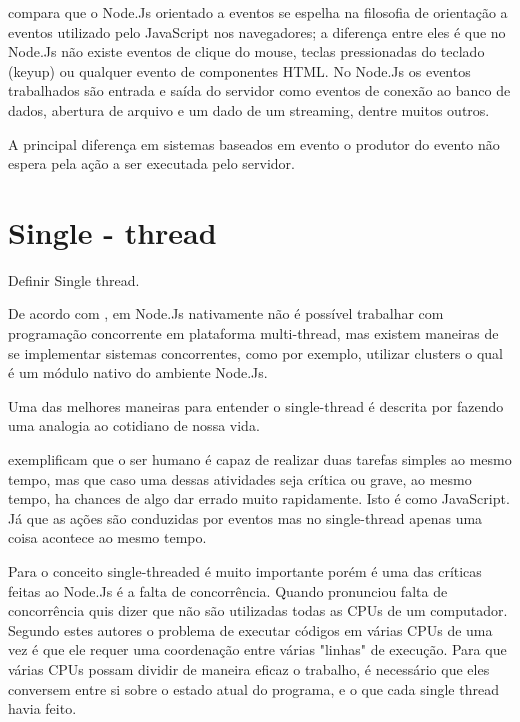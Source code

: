    compara que o Node.Js orientado a eventos se espelha na filosofia de orientação 
  a eventos utilizado pelo JavaScript nos navegadores; a diferença entre eles é que no Node.Js 
  não existe eventos de clique do mouse, teclas pressionadas do teclado (keyup) ou qualquer evento de componentes HTML.
  No Node.Js os eventos trabalhados são entrada e saída do servidor como eventos de conexão 
  ao banco de dados, abertura de arquivo e um dado de um streaming, dentre muitos outros.
  
  A principal diferença em sistemas baseados em evento o produtor do evento não espera pela ação a ser executada
  pelo servidor. \cite{Junior:2012}   


\section{Single - thread}
\label{single-thread}

  Definir Single thread.
  
  De acordo com , em Node.Js nativamente não é possível trabalhar com programação 
  concorrente em plataforma multi-thread, mas existem maneiras de se implementar sistemas concorrentes, 
  como por exemplo, utilizar clusters o qual é um módulo nativo do ambiente Node.Js.
  
  Uma das melhores maneiras para entender o single-thread é descrita por 
  fazendo uma analogia ao cotidiano de nossa vida.
  
   exemplificam que o ser humano é capaz de realizar duas tarefas simples ao mesmo tempo,
  mas que caso uma dessas atividades seja crítica ou grave, ao mesmo tempo, ha chances de algo dar errado muito rapidamente. 
  Isto é como JavaScript. Já que as ações são conduzidas por eventos mas no single-thread apenas uma coisa 
  acontece ao mesmo tempo.
  
  Para  o conceito single-threaded é muito importante porém é uma das críticas 
  feitas ao Node.Js é a falta de concorrência. Quando  pronunciou falta de concorrência 
  quis dizer que não são utilizadas todas as CPUs de um computador. 
  Segundo estes autores o problema de executar códigos em várias CPUs de uma vez é que ele requer 
  uma coordenação entre várias "linhas" de execução. Para que várias CPUs possam dividir de maneira eficaz o trabalho, 
  é necessário que eles conversem entre si sobre o estado atual do programa, e o que cada single thread havia feito.
  
